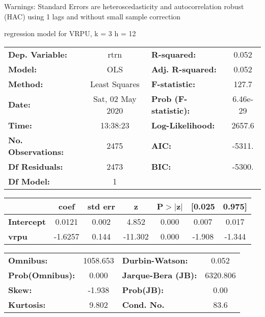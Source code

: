 Warnings: \newline
 [1] Standard Errors are heteroscedasticity and autocorrelation robust (HAC) using 1 lags and without small sample correction\ 

regression model for VRPU, k = 3 h = 12\begin{center}
\begin{tabular}{lclc}
\toprule
\textbf{Dep. Variable:}    &       rtrn       & \textbf{  R-squared:         } &     0.052   \\
\textbf{Model:}            &       OLS        & \textbf{  Adj. R-squared:    } &     0.052   \\
\textbf{Method:}           &  Least Squares   & \textbf{  F-statistic:       } &     127.7   \\
\textbf{Date:}             & Sat, 02 May 2020 & \textbf{  Prob (F-statistic):} &  6.46e-29   \\
\textbf{Time:}             &     13:38:23     & \textbf{  Log-Likelihood:    } &    2657.6   \\
\textbf{No. Observations:} &        2475      & \textbf{  AIC:               } &    -5311.   \\
\textbf{Df Residuals:}     &        2473      & \textbf{  BIC:               } &    -5300.   \\
\textbf{Df Model:}         &           1      & \textbf{                     } &             \\
\bottomrule
\end{tabular}
\begin{tabular}{lcccccc}
                   & \textbf{coef} & \textbf{std err} & \textbf{z} & \textbf{P$> |$z$|$} & \textbf{[0.025} & \textbf{0.975]}  \\
\midrule
\textbf{Intercept} &       0.0121  &        0.002     &     4.852  &         0.000        &        0.007    &        0.017     \\
\textbf{vrpu}      &      -1.6257  &        0.144     &   -11.302  &         0.000        &       -1.908    &       -1.344     \\
\bottomrule
\end{tabular}
\begin{tabular}{lclc}
\textbf{Omnibus:}       & 1058.653 & \textbf{  Durbin-Watson:     } &    0.052  \\
\textbf{Prob(Omnibus):} &   0.000  & \textbf{  Jarque-Bera (JB):  } & 6320.806  \\
\textbf{Skew:}          &  -1.938  & \textbf{  Prob(JB):          } &     0.00  \\
\textbf{Kurtosis:}      &   9.802  & \textbf{  Cond. No.          } &     83.6  \\
\bottomrule
\end{tabular}
\end{center}

